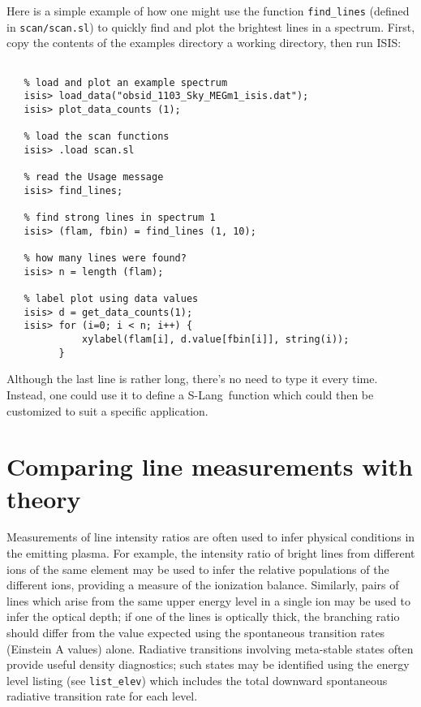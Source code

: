 \documentclass{book}
\newcommand{\isis}{{\sc ISIS}}
\newcommand{\slang}{{\sc S-Lang}}
\begin{document}
{Here is a simple example of how one might use the function {\tt find\_lines}
(defined in {\tt scan/scan.sl}) to quickly find and plot
the brightest lines in a spectrum. First, copy the contents of the
examples directory a working directory, then run \isis:
\begin{verbatim}

   % load and plot an example spectrum
   isis> load_data("obsid_1103_Sky_MEGm1_isis.dat");
   isis> plot_data_counts (1);

   % load the scan functions
   isis> .load scan.sl

   % read the Usage message
   isis> find_lines;

   % find strong lines in spectrum 1
   isis> (flam, fbin) = find_lines (1, 10);

   % how many lines were found?
   isis> n = length (flam);

   % label plot using data values
   isis> d = get_data_counts(1);
   isis> for (i=0; i < n; i++) {
             xylabel(flam[i], d.value[fbin[i]], string(i));
         }
\end{verbatim}
Although the last line is rather long, there's no need to type it
every time.  Instead, one could use it to define a \slang\
function which could then be customized to suit a specific application.

\section{Comparing line measurements with theory}

Measurements of line intensity ratios are often used to infer physical
conditions in the emitting plasma.  For example, the intensity ratio of
bright lines from different ions of the same element may be used to infer
the relative populations of the different ions, providing a measure of the
ionization balance.  Similarly, pairs of lines which arise from the same
upper energy level in a single ion may be used to infer the optical depth;
if one of the lines is optically thick, the branching ratio should differ
from the value expected using the spontaneous transition rates (Einstein A
values) alone.  Radiative transitions involving meta-stable states often
provide useful density diagnostics; such states may be identified using
the energy level listing (see {\tt list\_elev}) which includes the total
downward spontaneous radiative transition rate for each level.

}
\end{document}
